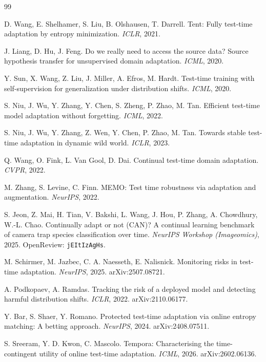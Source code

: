 \begin{thebibliography}{99}\itemsep2pt

 D. Wang, E. Shelhamer, S. Liu, B. Olshausen, T. Darrell.
Tent: Fully test-time adaptation by entropy minimization. \emph{ICLR}, 2021.

 J. Liang, D. Hu, J. Feng. Do we really need to access the
source data? Source hypothesis transfer for unsupervised domain adaptation.
\emph{ICML}, 2020.

 Y. Sun, X. Wang, Z. Liu, J. Miller, A. Efros, M. Hardt.
Test-time training with self-supervision for generalization under distribution
shifts. \emph{ICML}, 2020.

 S. Niu, J. Wu, Y. Zhang, Y. Chen, S. Zheng, P. Zhao, M. Tan.
Efficient test-time model adaptation without forgetting. \emph{ICML}, 2022.

 S. Niu, J. Wu, Y. Zhang, Z. Wen, Y. Chen, P. Zhao, M. Tan.
Towards stable test-time adaptation in dynamic wild world. \emph{ICLR}, 2023.

 Q. Wang, O. Fink, L. Van Gool, D. Dai.
Continual test-time domain adaptation. \emph{CVPR}, 2022.

 M. Zhang, S. Levine, C. Finn.
MEMO: Test time robustness via adaptation and augmentation. \emph{NeurIPS}, 2022.

 S. Jeon, Z. Mai, H. Tian, V. Bakshi, L. Wang, J. Hou, P. Zhang,
A. Chowdhury, W.-L. Chao. Continually adapt or not (CAN)? A continual learning benchmark
of camera trap species classification over time. \emph{NeurIPS Workshop (Imageomics)},
2025. OpenReview: \texttt{jEItIzAgHs}.

 M. Schirmer, M. Jazbec, C. A. Naesseth, E. Nalisnick.
Monitoring risks in test-time adaptation. \emph{NeurIPS}, 2025. arXiv:2507.08721.

 A. Podkopaev, A. Ramdas. Tracking the risk of a
deployed model and detecting harmful distribution shifts. \emph{ICLR}, 2022.
arXiv:2110.06177.

 Y. Bar, S. Shaer, Y. Romano. Protected test-time adaptation via
online entropy matching: A betting approach. \emph{NeurIPS}, 2024. arXiv:2408.07511.

 S. Sreeram, Y. D. Kwon, C. Mascolo.
Tempora: Characterising the time-contingent utility of online test-time adaptation.
\emph{ICML}, 2026. arXiv:2602.06136.


\end{thebibliography}

